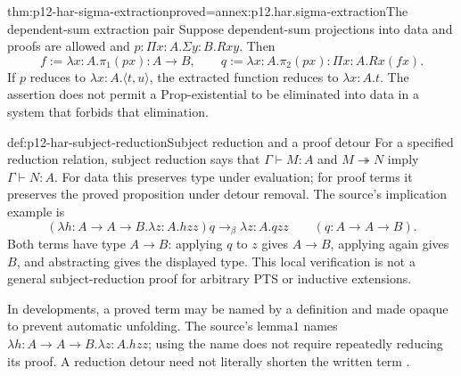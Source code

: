 \begin{hbtheorem}{thm:p12-har-sigma-extraction}{proved=annex:p12.har.sigma-extraction}{The dependent-sum extraction pair}
Suppose dependent-sum projections into data and proofs are allowed and
\(p:\Pi x:A.\Sigma y:B.Rxy\). Then
\[
 f:=\lambda x:A.\pi_1(px):A\to B,\qquad
 q:=\lambda x:A.\pi_2(px):\Pi x:A.Rx(fx).
\]
If \(p\) reduces to \(\lambda x:A.\langle t,u\rangle\), the
extracted function reduces to \(\lambda x:A.t\). The assertion does not
permit a \(\mathrm{Prop}\)-existential to be eliminated into data in a
system that forbids that elimination.
\end{hbtheorem}

\begin{hbdefinition}{def:p12-har-subject-reduction}{Subject reduction and a proof detour}
For a specified reduction relation, subject reduction says that
\(\Gamma\vdash M:A\) and \(M\twoheadrightarrow N\) imply
\(\Gamma\vdash N:A\). For data this preserves type under evaluation;
for proof terms it preserves the proved proposition under detour removal.
The source's implication example is
\[
 (\lambda h:A\to A\to B.\lambda z:A.hzz)q
       \to_\beta\lambda z:A.qzz
 \qquad(q:A\to A\to B).
\]
Both terms have type \(A\to B\): applying \(q\) to \(z\)
gives \(A\to B\), applying again gives \(B\), and abstracting
gives the displayed type. This local verification is not a general
subject-reduction proof for arbitrary PTS or inductive extensions.

In developments, a proved term may be named by a definition and made opaque
to prevent automatic unfolding. The source's \(\mathrm{lemma1}\) names
\(\lambda h:A\to A\to B.\lambda z:A.hzz\); using the name
does not require repeatedly reducing its proof. A reduction detour need not
literally shorten the written term \cite[p.~1166]{BarendregtGeuvers2001}.
\end{hbdefinition}

